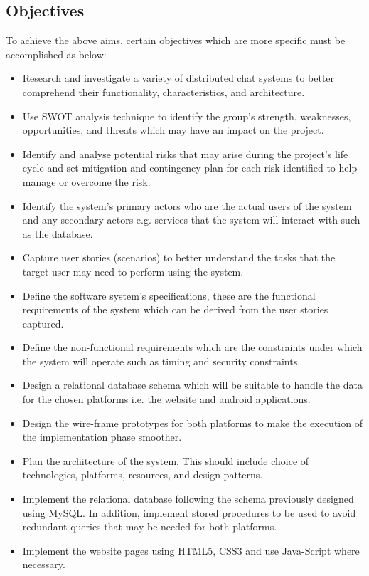 \documentclass{article}
\begin{document}
\subsection{Objectives}
To achieve the above aims, certain objectives which are more specific must be accomplished as below: \par
\begin{itemize}
    \item Research and investigate a variety of distributed chat systems to better comprehend their functionality, characteristics, and architecture. 
    \item Use SWOT analysis technique to identify the group’s strength, weaknesses, opportunities, and threats which may have an impact on the project. 
    \item Identify and analyse potential risks that may arise during the project’s life cycle and set mitigation and contingency plan for each risk identified to help manage or overcome the risk. 
    \item Identify the system’s primary actors who are the actual users of the system and any secondary actors e.g. services that the system will interact with such as the database.
    \item Capture user stories (scenarios) to better understand the tasks that the target user may need to perform using the system. 
    \item Define the software system’s specifications, these are the functional requirements of the system which can be derived from the user stories captured. 
    \item Define the non-functional requirements which are the constraints under which the system will operate such as timing and security constraints. 
    \item Design a relational database schema which will be suitable to handle the data for the chosen platforms i.e. the website and android applications. 
    \item Design the wire-frame prototypes for both platforms to make the execution of the implementation phase smoother. 
    \item Plan the architecture of the system. This should include choice of technologies, platforms, resources, and design patterns. 
    \item Implement the relational database following the schema previously designed using MySQL. In addition, implement stored procedures to be used to avoid redundant queries that may be needed for both platforms.
    \item Implement the website pages using HTML5, CSS3 and use Java-Script where necessary. 

\end{itemize}
\end{document}
